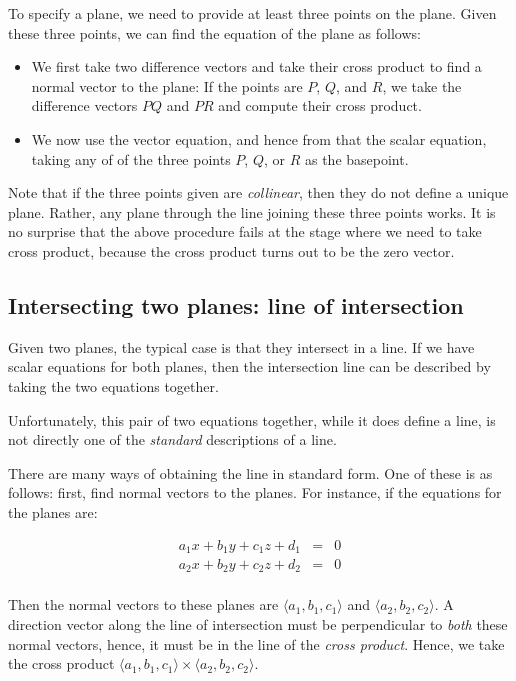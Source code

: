\documentclass[10pt]{amsart}
\begin{document}
To specify a plane, we need to provide at least three points on the
plane. Given these three points, we can find the equation of the plane
as follows:

\begin{itemize}
\item We first take two difference vectors and take their cross
  product to find a normal vector to the plane: If the points are $P$,
  $Q$, and $R$, we take the difference vectors $PQ$ and $PR$ and
  compute their cross product.
\item We now use the vector equation, and hence from that the scalar
  equation, taking any of of the three points $P$, $Q$, or $R$ as the
  basepoint.
\end{itemize}

Note that if the three points given are {\em collinear}, then they do
not define a unique plane. Rather, any plane through the line joining
these three points works. It is no surprise that the above procedure
fails at the stage where we need to take cross product, because the
cross product turns out to be the zero vector.
\subsection{Intersecting two planes: line of intersection}

Given two planes, the typical case is that they intersect in a
line. If we have scalar equations for both planes, then the
intersection line can be described by taking the two equations
together.

Unfortunately, this pair of two equations together, while it does
define a line, is not directly one of the {\em standard} descriptions
of a line.

There are many ways of obtaining the line in standard form. One of
these is as follows: first, find normal vectors to the planes. For
instance, if the equations for the planes are:

\begin{eqnarray*}
  a_1x + b_1y + c_1z + d_1 & = & 0\\
  a_2x + b_2y + c_2z + d_2 & = & 0\\
\end{eqnarray*}

Then the normal vectors to these planes are $\langle
a_1,b_1,c_1\rangle$ and $\langle a_2,b_2,c_2\rangle$. A direction
vector along the line of intersection must be perpendicular to {\em
both} these normal vectors, hence, it must be in the line of the {\em
cross product}. Hence, we take the cross product $\langle a_1,b_1,c_1
\rangle \times \langle a_2,b_2,c_2 \rangle$.
\end{document}
